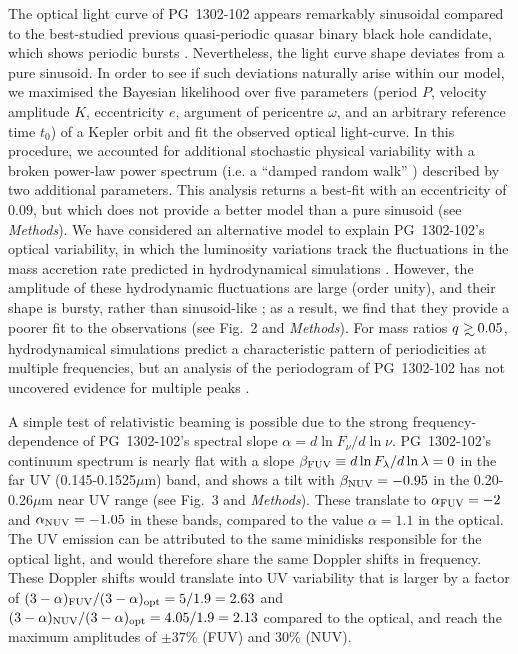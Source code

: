 The optical light curve of PG~1302-102 appears remarkably sinusoidal
compared to the best-studied previous quasi-periodic quasar binary
black hole candidate, which shows periodic bursts \cite{Valtonen+2008}.
Nevertheless, the light curve shape deviates from a pure sinusoid. In
order to see if such deviations naturally arise within our model, we
maximised the Bayesian likelihood over five parameters (period $P$,
velocity amplitude $K$, eccentricity $e$, argument of pericentre
$\omega$, and an arbitrary reference time $t_0$) of a Kepler
orbit \cite{WrightGaudi2012} and fit the observed optical light-curve.
In this procedure, we accounted for additional stochastic physical
variability with a broken power-law power spectrum (i.e. a ``damped
random walk'' \cite{Kelly:2009:DRW}) described by two additional
parameters.  This analysis returns a best-fit 
%
with an eccentricity of $0.09$, but which does not provide a better model than a pure sinusoid (see {\it Methods}).
%
We have considered an alternative model to explain PG~1302-102's
optical variability, in which the luminosity variations track the
fluctuations in the mass accretion rate predicted in hydrodynamical
simulations \cite{MacFadyen:2008,ShiKrolik:2012,Roedig:2012:Trqs,DHM:2013:MNRAS,Farris:2014}.
However, the amplitude of these hydrodynamic fluctuations are large
(order unity), and their shape is bursty, rather than
sinusoid-like \cite{DHM:2013:MNRAS,Farris:2014,ShiKrolik:2015}; as a
result, we find that they provide a poorer fit to the observations
(see Fig.~2 and {\it Methods}).  For mass ratios $q\gsim 0.05$,
hydrodynamical simulations predict a characteristic pattern of
periodicities at multiple frequencies, but an analysis of the
periodogram of PG~1302-102 has not uncovered evidence for multiple
peaks \cite{PG1302-Maria}.

A simple test of relativistic beaming is possible due to the strong
frequency-dependence of PG~1302-102's spectral slope $\alpha=d\ln
F_\nu /d\ln\nu$.  PG~1302-102's continuum spectrum is nearly flat with
a slope $\beta_{\rm FUV}\equiv d\ln F_\lambda /d\ln\lambda=0$ in the
far UV (0.145-0.1525$\mu$m) band, and shows a tilt with $\beta_{\rm
  NUV}=-0.95$ in the 0.20-0.26$\mu$m near UV range (see Fig.~3 and
{\it Methods}).  These translate to $\alpha_{\rm FUV}=-2$ and
$\alpha_{\rm NUV}=-1.05$ in these bands, compared to the value
$\alpha=1.1$ in the optical.  The UV emission can be attributed to the
same minidisks responsible for the optical light, and would therefore
share the same Doppler shifts in frequency. These Doppler shifts would
translate into UV variability that is larger by a factor of
$(3-\alpha)_{\rm FUV}/(3-\alpha)_{\rm opt}=5/1.9 = 2.63$ and
$(3-\alpha)_{\rm NUV}/(3-\alpha)_{\rm opt}=4.05/1.9 = 2.13$ compared
to the optical, and reach the maximum amplitudes of $\pm 37\%$ (FUV)
and 30\% (NUV).

